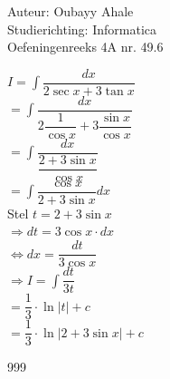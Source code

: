 \documentclass[a4paper]{article}
\newcommand{\dint}{\displaystyle\int}
\begin{document}
  
\noindent \large Auteur: Oubayy Ahale          \\
\noindent \large Studierichting: Informatica   \\
\noindent \large Oefeningenreeks 4A nr. 49.6   \\

\medskip

\normalsize 

$ I = \dint \dfrac{dx}{2 \sec x + 3 \tan x} $\\

$ = \dint \dfrac{dx}{2 \dfrac{1}{\cos x} + 3 \dfrac{\sin x}{\cos x}} $\\



$ = \dint \dfrac{dx}{\dfrac{2 + 3 \sin x}{\cos x}} $\\



$ = \dint \dfrac{\cos x}{2+3 \sin x} dx $\\

Stel $ t = 2+3 \sin x $\\

$ \Rightarrow dt = 3 \cos x \cdot dx           $\\

$ \Leftrightarrow dx = \dfrac{dt}{3 \cos x}    $\\

$ \Rightarrow I = \dint \dfrac{dt}{3t}         $\\

$ = \dfrac{1}{3} \cdot \ln{\left|t\right|} + c $\\

$ = \dfrac{1}{3} \cdot \ln{\left|2+3 \sin x\right|} + c $\\

\begin{thebibliography}{999}
\end{thebibliography}
\end{document}
